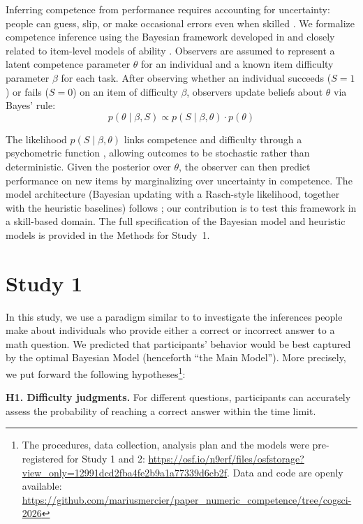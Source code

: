 \documentclass[10pt,letterpaper]{article}
\begin{document}
Inferring competence from performance requires accounting for uncertainty: people can guess, slip, or make occasional errors even when skilled \citep{Jones-1989}. We formalize competence inference using the Bayesian framework developed in \citet{Mercier-2026} and closely related to item-level models of ability \citep{Jansen-2021}. Observers are assumed to represent a latent competence parameter $\theta$ for an individual and a known item difficulty parameter $\beta$ for each task. After observing whether an individual succeeds ($S=1$) or fails ($S=0$) on an item of difficulty $\beta$, observers update beliefs about $\theta$ via Bayes’ rule:
\begin{equation}
p(\theta \mid \beta, S) \propto p(S \mid \beta, \theta) \cdot p(\theta)
\label{eq:bayes}
\end{equation}

The likelihood $p(S \mid \beta, \theta)$ links competence and difficulty through a psychometric function \citep[with an Item Response Theory mapping,][]{Rasch-1960}, allowing outcomes to be stochastic rather than deterministic. Given the posterior over $\theta$, the observer can then predict performance on new items by marginalizing over uncertainty in competence. The model architecture (Bayesian updating with a Rasch-style likelihood, together with the heuristic baselines) follows \citet{Mercier-2026}; our contribution is to test this framework in a skill-based domain. The full specification of the Bayesian model and heuristic models is provided in the Methods for Study~1.

\section{Study 1}\label{study-1}

In this study, we use a paradigm similar to \citet{Mercier-2026} to investigate the inferences people make about individuals who provide either a correct or incorrect answer to a math question. We predicted that participants' behavior would be best captured by the optimal Bayesian Model (henceforth ``the Main Model''). More precisely, we put forward the following hypotheses\footnote{The procedures, data collection, analysis plan and the models were pre-registered for Study 1 and 2: \url{https://osf.io/n9erf/files/osfstorage?view_only=12991dcd2fba4fe2b9a1a77339d6cb2f}. Data and code are openly available: \url{https://github.com/mariusmercier/paper_numeric_competence/tree/cogsci-2026}}:

\textbf{H1. Difficulty judgments.} For different questions, participants can accurately assess the probability of reaching a correct answer within the time limit.
\end{document}
